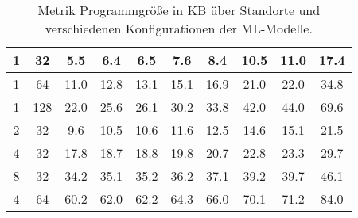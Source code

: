 \begin{table}[h!]
\begin{tabular}{ | c | c | c | c | c | c | c | c | c | c | }
        1 & 32 & 5.5 & 6.4 & 6.5 & 7.6 & 8.4 & 10.5 & 11.0 & 17.4 \\\hline
        1 & 64 & 11.0 & 12.8 & 13.1 & 15.1 & 16.9 & 21.0 & 22.0 & 34.8 \\\hline
        1 & 128 & 22.0 & 25.6 & 26.1 & 30.2 & 33.8 & 42.0 & 44.0 & 69.6 \\\hline
        2 & 32 & 9.6 & 10.5 & 10.6 & 11.6 & 12.5 & 14.6 & 15.1 & 21.5 \\\hline
        4 & 32 & 17.8 & 18.7 & 18.8 & 19.8 & 20.7 & 22.8 & 23.3 & 29.7 \\\hline
        8 & 32 & 34.2 & 35.1 & 35.2 & 36.2 & 37.1 & 39.2 & 39.7 & 46.1 \\\hline
        4 & 64 & 60.2 & 62.0 & 62.2 & 64.3 & 66.0 & 70.1 & 71.2 & 84.0 \\\hline
    \end{tabular}
    \caption{Metrik Programmgröße in KB über Standorte und verschiedenen Konfigurationen der ML-Modelle.}
    \label{tab:predictions_by_loc_size}
\end{table}